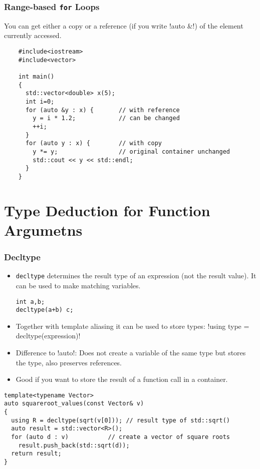 \begin{frame}[fragile]
  \frametitle<presentation>{Range-based \texttt{for} Loops}

  You can get either a copy or a reference (if you write \inline!auto &!) of the element currently accessed.

  \begin{lstlisting}
    #include<iostream>
    #include<vector>

    int main()
    {
      std::vector<double> x(5);
      int i=0;
      for (auto &y : x) {       // with reference
        y = i * 1.2;            // can be changed
        ++i;
      }
      for (auto y : x) {        // with copy
        y *= y;                 // original container unchanged
        std::cout << y << std::endl;
      }
    }
  \end{lstlisting}

\end{frame}

\section{Type Deduction for Function Argumetns}

\begin{frame}[fragile]
\frametitle{Decltype}
\begin{itemize}
\item \lstinline!decltype! determines the result type of an expression (not the result value). It can be used to make matching variables.
\begin{lstlisting}
int a,b;
decltype(a+b) c;
\end{lstlisting}
\item Together with template aliasing it can 
be used to store types:
\inline!using type = decltype(expression)! 
\item Difference to \inline!auto!: Does not create a variable of the same type but stores the type, also preserves references.
\item Good if you want to store the result of a function call in a container.
\end{itemize}
\begin{lstlisting}
template<typename Vector>
auto squareroot_values(const Vector& v)
{
  using R = decltype(sqrt(v[0])); // result type of std::sqrt()
  auto result = std::vector<R>();
  for (auto d : v)           // create a vector of square roots
    result.push_back(std::sqrt(d)); 
  return result;
}
\end{lstlisting}

\end{frame}

